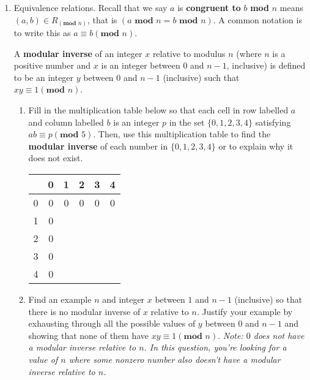\begin{enumerate}[labelindent=0pt, leftmargin=0pt]
    \item Equivalence relations.  Recall that we say $a$ is {\bf congruent to} $b$ \textbf{mod} $n$ 
    means $(a, b) \in R_{(\textbf{mod } n)}$, that is $(a \textbf{ mod } n = b \textbf{ mod } n)$.
    A common notation is to write this as $a \equiv b (\textbf{mod } n)$.
    
    A {\bf modular inverse} of an integer $x$ relative to modulus $n$ (where $n$ 
    is a positive number and $x$ is an integer between $0$ and $n-1$, inclusive) 
    is defined to be an integer $y$ between $0$ and $n-1$ (inclusive) such that 
    $xy \equiv 1 (\textbf{mod } n)$.
    \begin{enumerate}
        \item\gradeComplete Fill in the multiplication table below so that each  cell in 
        row labelled $a$ and column labelled $b$ is an integer $p$ in the set $\{0, 1, 2, 3, 4\}$
        satisfying $ab \equiv p ({\textbf{mod } 5})$.
        Then, use this multiplication table to find the {\bf modular inverse}
        of each number in $\{0,1,2,3,4\}$ or to explain why it does not exist.

        \begin{center}
            \begin{tabular}{|c||c|c|c|c|c|}
                \hline
                  & 0 & 1 & 2 & 3 & 4 \\
                  \hline \hline
                0 & 0 & 0 & 0 & 0 & 0 \\
                \hline
                1 & 0 & ~ & ~ & ~ & ~ \\
                \hline
                2 & 0 & ~ & ~ & ~ & ~ \\
                \hline
                3 & 0 & ~ & ~ & ~ & ~ \\
                \hline
                4 & 0 & ~ & ~ & ~ & ~ \\
                \hline
            \end{tabular}
        \end{center}

        \item\gradeCorrect Find an example $n$ and integer $x$ between $1$ and $n-1$ (inclusive)
        so that there is no modular inverse of $x$ relative to $n$. Justify your example by 
        exhausting through all the possible values of $y$ between $0$ and $n-1$ and showing that 
        none of them have $xy \equiv 1 (\textbf{mod } n)$.  {\it Note: $0$ does not have a modular 
        inverse relative to $n$. In this question, you're looking for a value of $n$ where some nonzero 
        number also doesn't have a modular inverse relative to $n$.}
    \end{enumerate}
    



\end{enumerate}
